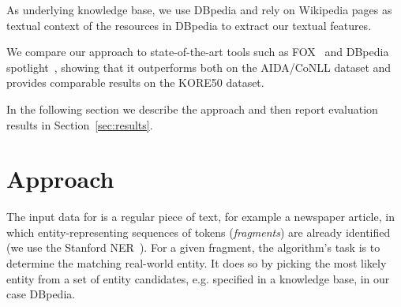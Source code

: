 \documentclass[runningheads,a4paper]{llncs}
\begin{document}
As underlying knowledge base, we use DBpedia and rely on Wikipedia pages as textual context of the resources in DBpedia to extract our textual features.

We compare our approach to state-of-the-art tools such as FOX~\cite{foxdemo} and DBpedia spotlight~\cite{spotlight}, showing that it outperforms both on the AIDA/CoNLL dataset and provides comparable results on the KORE50 dataset.

In the following section we describe the approach and then report evaluation results in Section~\ref{sec:results}.


\section{Approach}\label{sec:approach}

The input data for {\acronym} is a regular piece of text, for example a newspaper article, in which entity-representing sequences of tokens (\emph{fragments}) are already identified (we use the Stanford NER~\cite{ner}). For a given fragment, the algorithm's task is to determine the matching real-world entity. It does so by picking the most likely entity from a set of entity candidates, e.g. specified in a knowledge base, in our case DBpedia. 
\end{document}
